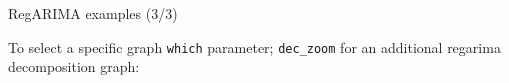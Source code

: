 \documentclass[10pt,xcolor=table,color={dvipsnames,usenames},ignorenonframetext,usepdftitle=false,french]{beamer}
\newenvironment{Shaded}{\begin{snugshade}}{\end{snugshade}}
\newcommand{\KeywordTok}[1]{\textcolor[rgb]{0.13,0.29,0.53}{\textbf{#1}}}
\newcommand{\DataTypeTok}[1]{\textcolor[rgb]{0.13,0.29,0.53}{#1}}
\newcommand{\DecValTok}[1]{\textcolor[rgb]{0.00,0.00,0.81}{#1}}
\newcommand{\OtherTok}[1]{\textcolor[rgb]{0.56,0.35,0.01}{#1}}
\newcommand{\NormalTok}[1]{#1}
\begin{document}
\begin{frame}[fragile]{RegARIMA examples (3/3)}

\footnotesize

To select a specific graph \texttt{which} parameter; \texttt{dec\_zoom}
for an additional regarima decomposition graph:

\begin{Shaded}
\begin{Highlighting}[]
\KeywordTok{plot}\NormalTok{(regarima_model, }\DataTypeTok{which =} \DecValTok{6}\NormalTok{, }\DataTypeTok{dec_zoom =} \OtherTok{TRUE}\NormalTok{)}
\end{Highlightin
\end{Highlighting}
\end{Shaded}
\end{frame}
\end{document}
